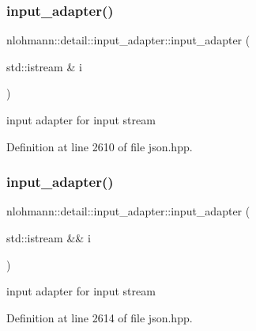 \subsubsection{\texorpdfstring{input\_adapter()}{input\_adapter()}\hspace{0.1cm}{\footnotesize\ttfamily [2/11]}}
{\footnotesize\ttfamily nlohmann\+::detail\+::input\+\_\+adapter\+::input\+\_\+adapter (\begin{DoxyParamCaption}\item[{std\+::istream \&}]{i }\end{DoxyParamCaption})\hspace{0.3cm}{\ttfamily [inline]}}



input adapter for input stream 



Definition at line 2610 of file json.\+hpp.

\mbox{\label{classnlohmann_1_1detail_1_1input__adapter_af002dd2e53ac0855a03cb68d0ce626b2}} 
\subsubsection{\texorpdfstring{input\_adapter()}{input\_adapter()}\hspace{0.1cm}{\footnotesize\ttfamily [3/11]}}
{\footnotesize\ttfamily nlohmann\+::detail\+::input\+\_\+adapter\+::input\+\_\+adapter (\begin{DoxyParamCaption}\item[{std\+::istream \&\&}]{i }\end{DoxyParamCaption})\hspace{0.3cm}{\ttfamily [inline]}}



input adapter for input stream 



Definition at line 2614 of file json.\+hpp.

\mbox{\label{classnlohmann_1_1detail_1_1input__adapter_a32f5ddd06562edce43ee86f5b5c2031b}} 
